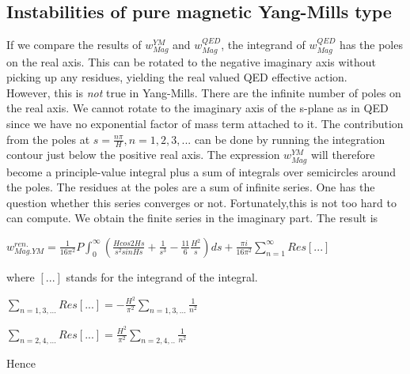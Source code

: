 \documentclass[a4paper,12 pt]{article}
\begin{document}
\subsection{Instabilities of pure magnetic Yang-Mills type}
If we compare the results of $w_{Mag}^{YM}$ and $w_{Mag}^{QED}$,
the integrand of $w_{Mag}^{QED}$ has the poles on the real axis.
This can be rotated to the negative imaginary axis without picking
up any residues, yielding the real valued QED effective action.\\
However, this is \emph{not} true in Yang-Mills. There are  the
infinite number of poles on the real axis. We cannot rotate to the
imaginary axis of the s-plane as in QED since we have no
exponential factor of mass term attached to it. The contribution
from the poles at $ s = \frac{n \pi}{H}, n = 1,2,3,...$ can be
done by running the integration contour just below the positive
real axis. The expression $w_{Mag}^{YM}$ will therefore become a
principle-value integral plus a sum of integrals over semicircles
around the poles. The residues at the poles are a sum of infinite
series. One has the question whether this series converges or not.
Fortunately,this is not too hard to can compute. We obtain the
finite series in the imaginary part. The result is
\begin{center}
$ w^{ren.}_{Mag.YM} = \frac{1}{16 \pi^{2}}P
\int_{0}^{\infty}(\frac{H cos 2Hs}{s^{2} sin Hs}+ \frac{1}{s^{3}}
- \frac{11}{6}\frac{H^{2}}{s}) ds + \frac{\pi i}{16 \pi^{2}}
\sum_{n=1}^{\infty} Res [...]  $

\end{center}
where $[...]$ stands for the integrand of the integral.
\begin{center}
$\sum_{n=1,3,...}Res [...]= -\frac{H^{2}}{\pi^{2}}\sum_{n=1,3,...}
\frac{1}{n^{2}}$
\end{center}
\begin{center}
$ \sum_{n=
2,4,...}Res[...]=\frac{H^{2}}{\pi^{2}}\sum_{n=2,4,..}\frac{1}{n^{2}}$
\end{center}
Hence
\end{document}
